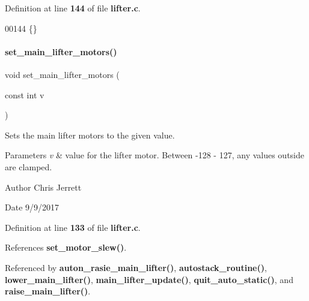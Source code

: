 Definition at line \textbf{ 144} of file \textbf{ lifter.\+c}.


\begin{DoxyCode}
00144 \{\}
\end{DoxyCode}
\mbox{\label{lifter_8h_ad00a195af30f246924d6e1a30095b882}} 
\paragraph{set\+\_\+main\+\_\+lifter\+\_\+motors()}
{\footnotesize\ttfamily void set\+\_\+main\+\_\+lifter\+\_\+motors (\begin{DoxyParamCaption}\item[{const int}]{v }\end{DoxyParamCaption})}



Sets the main lifter motors to the given value. 


\begin{DoxyParams}{Parameters}
{\em v} & value for the lifter motor. Between -\/128 -\/ 127, any values outside are clamped. \\
\hline
\end{DoxyParams}
\begin{DoxyAuthor}{Author}
Chris Jerrett 
\end{DoxyAuthor}
\begin{DoxyDate}{Date}
9/9/2017 
\end{DoxyDate}


Definition at line \textbf{ 133} of file \textbf{ lifter.\+c}.



References \textbf{ set\+\_\+motor\+\_\+slew()}.



Referenced by \textbf{ auton\+\_\+rasie\+\_\+main\+\_\+lifter()}, \textbf{ autostack\+\_\+routine()}, \textbf{ lower\+\_\+main\+\_\+lifter()}, \textbf{ main\+\_\+lifter\+\_\+update()}, \textbf{ quit\+\_\+auto\+\_\+static()}, and \textbf{ raise\+\_\+main\+\_\+lifter()}.


